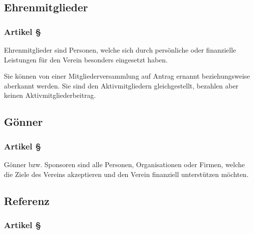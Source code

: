 \subsection{Ehrenmitglieder}

\subsubsection*{Artikel §\articlenumber}
Ehrenmitglieder sind Personen, welche sich durch persönliche oder finanzielle
Leistungen für den Verein besonders eingesetzt haben.

Sie können von einer Mitgliederversammlung auf Antrag ernannt beziehungsweise
aberkannt werden. Sie sind den Aktivmitgliedern gleichgestellt, bezahlen aber
keinen Aktivmitgliederbeitrag.

\subsection{Gönner}

\subsubsection*{Artikel §\articlenumber}
Gönner bzw. Sponsoren sind alle Personen, Organisationen oder Firmen, welche
die Ziele des Vereins akzeptieren und den Verein finanziell unterstützen
möchten.

\subsection{Referenz}
\subsubsection*{Artikel §\articlenumber}


